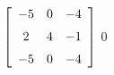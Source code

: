 {$\left[ \begin {array}{ccc} -5&0&-4\\\noalign{\medskip}2&4&-1
\\\noalign{\medskip}-5&0&-4\end {array} \right]$} 
{$0$}

  

 

